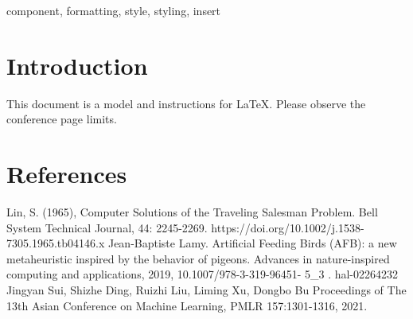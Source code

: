 \documentclass[conference]{IEEEtran}
\begin{document}
\begin{IEEEkeywords}
component, formatting, style, styling, insert
\end{IEEEkeywords}

\section{Introduction}
This document is a model and instructions for \LaTeX.
Please observe the conference page limits. 








\section*{References}

\begin{thebibliography}{00}
 Lin, S. (1965), Computer Solutions of the Traveling Salesman Problem. Bell System Technical Journal, 44: 2245-2269. https://doi.org/10.1002/j.1538-7305.1965.tb04146.x
 Jean-Baptiste Lamy. Artificial Feeding Birds (AFB): a new metaheuristic inspired by the behavior of pigeons. Advances in nature-inspired computing and applications, 2019, 10.1007/978-3-319-96451- 5\_3 . hal-02264232
 Jingyan Sui, Shizhe Ding, Ruizhi Liu, Liming Xu, Dongbo Bu Proceedings of The 13th Asian Conference on Machine Learning, PMLR 157:1301-1316, 2021.

\end{thebibliography}
\vspace{12pt}
\end{document}
